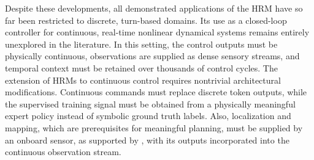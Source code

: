 \documentclass[12pt, a4paper]{article}
\begin{document}
Despite these developments, all demonstrated applications of the HRM have so far been restricted to discrete, turn-based domains.
Its use as a closed-loop controller for continuous, real-time nonlinear dynamical systems remains entirely unexplored in the literature.
In this setting, the control outputs must be physically continuous, observations are supplied as dense sensory streams, and temporal context must be retained over thousands of control cycles.
The extension of HRMs to continuous control requires nontrivial architectural modifications.
Continuous commands must replace discrete token outputs, while the supervised training signal must be obtained from a physically meaningful expert policy instead of symbolic ground truth labels.
Also, localization and mapping, which are prerequisites for meaningful planning, must be supplied by an onboard sensor, as supported by \cite{gupta_simultaneous_2022, milijas_comparison_2021, munguia_uav_2025, chen_slam_2022}, with its outputs incorporated into the continuous observation stream.
 
\end{document}
